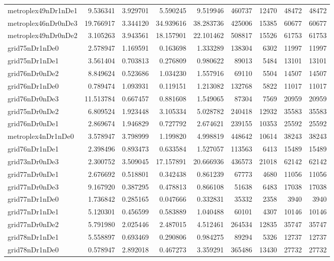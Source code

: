 \documentclass[../../../thesis.tex]{subfiles}
\begin{document}
\begin{longtable}{|l|r|r|r|r|r|r|r|r|}
metroplex49nDr1nDe1 & 9.536341 & 3.929701 & 5.590245 & 9.519946 & 460737 & 12470 & 48472 & 48472 \\
metroplex46nDr0nDe3 & 19.766917 & 3.344120 & 34.939616 & 38.283736 & 425006 & 15385 & 60677 & 60677 \\
metroplex49nDr0nDe2 & 3.105263 & 3.943561 & 18.157901 & 22.101462 & 508817 & 15526 & 61753 & 61753 \\
grid75nDr1nDe0 & 2.578947 & 1.169591 & 0.163698 & 1.333289 & 138304 & 6302 & 11997 & 11997 \\
grid75nDr1nDe1 & 3.561404 & 0.703813 & 0.276809 & 0.980622 & 89013 & 5484 & 13101 & 13101 \\
grid76nDr0nDe2 & 8.849624 & 0.523686 & 1.034230 & 1.557916 & 69110 & 5504 & 14507 & 14507 \\
grid76nDr1nDe0 & 0.789474 & 1.093931 & 0.119151 & 1.213082 & 132768 & 5822 & 11017 & 11017 \\
grid76nDr0nDe3 & 11.513784 & 0.667457 & 0.881608 & 1.549065 & 87304 & 7569 & 20959 & 20959 \\
grid75nDr0nDe2 & 6.809524 & 1.923448 & 3.105334 & 5.028782 & 240418 & 12932 & 35583 & 35583 \\
grid76nDr0nDe1 & 2.869674 & 1.946829 & 0.727792 & 2.674621 & 239155 & 10353 & 25592 & 25592 \\
metroplex4nDr1nDe0 & 3.578947 & 3.798999 & 1.199820 & 4.998819 & 448642 & 10614 & 38243 & 38243 \\
grid76nDr1nDe1 & 2.398496 & 0.893473 & 0.633584 & 1.527057 & 113563 & 6413 & 15489 & 15489 \\
grid73nDr0nDe3 & 2.300752 & 3.509045 & 17.157891 & 20.666936 & 436573 & 21018 & 62142 & 62142 \\
grid77nDr0nDe1 & 2.676692 & 0.518801 & 0.342438 & 0.861239 & 67773 & 4680 & 11056 & 11056 \\
grid77nDr0nDe3 & 9.167920 & 0.387295 & 0.478813 & 0.866108 & 51638 & 6483 & 17038 & 17038 \\
grid77nDr1nDe0 & 1.736842 & 0.285165 & 0.047666 & 0.332831 & 35332 & 2358 & 3940 & 3940 \\
grid77nDr1nDe1 & 5.120301 & 0.456599 & 0.583889 & 1.040488 & 60101 & 4307 & 10146 & 10146 \\
grid77nDr0nDe2 & 5.791980 & 2.025446 & 2.487015 & 4.512461 & 264534 & 12835 & 35747 & 35747 \\
grid78nDr1nDe1 & 5.558897 & 0.693469 & 0.290806 & 0.984275 & 89294 & 5326 & 12737 & 12737 \\
grid78nDr1nDe0 & 0.578947 & 2.892018 & 0.467273 & 3.359291 & 365486 & 13430 & 27732 & 27732 \\

\end{longtable}
\end{document}

